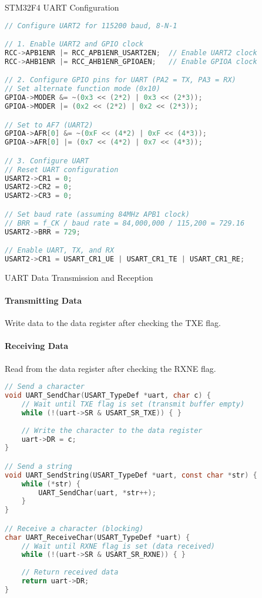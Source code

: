 \begin{code}{STM32F4 UART Configuration}
\begin{lstlisting}[language=C, style=basesmol]
// Configure UART2 for 115200 baud, 8-N-1

// 1. Enable UART2 and GPIO clock
RCC->APB1ENR |= RCC_APB1ENR_USART2EN;  // Enable UART2 clock
RCC->AHB1ENR |= RCC_AHB1ENR_GPIOAEN;   // Enable GPIOA clock

// 2. Configure GPIO pins for UART (PA2 = TX, PA3 = RX)
// Set alternate function mode (0x10)
GPIOA->MODER &= ~(0x3 << (2*2) | 0x3 << (2*3));
GPIOA->MODER |= (0x2 << (2*2) | 0x2 << (2*3));

// Set to AF7 (UART2)
GPIOA->AFR[0] &= ~(0xF << (4*2) | 0xF << (4*3));
GPIOA->AFR[0] |= (0x7 << (4*2) | 0x7 << (4*3));

// 3. Configure UART
// Reset UART configuration
USART2->CR1 = 0;
USART2->CR2 = 0;
USART2->CR3 = 0;

// Set baud rate (assuming 84MHz APB1 clock)
// BRR = f_CK / baud rate = 84,000,000 / 115,200 = 729.16
USART2->BRR = 729;

// Enable UART, TX, and RX
USART2->CR1 = USART_CR1_UE | USART_CR1_TE | USART_CR1_RE;
\end{lstlisting}
\end{code}

\begin{KR}{UART Data Transmission and Reception}
\paragraph{Transmitting Data}
Write data to the data register after checking the TXE flag.
\paragraph{Receiving Data}
Read from the data register after checking the RXNE flag.

\begin{lstlisting}[language=C, style=basesmol]
// Send a character
void UART_SendChar(USART_TypeDef *uart, char c) {
    // Wait until TXE flag is set (transmit buffer empty)
    while (!(uart->SR & USART_SR_TXE)) { }
    
    // Write the character to the data register
    uart->DR = c;
}

// Send a string
void UART_SendString(USART_TypeDef *uart, const char *str) {
    while (*str) {
        UART_SendChar(uart, *str++);
    }
}

// Receive a character (blocking)
char UART_ReceiveChar(USART_TypeDef *uart) {
    // Wait until RXNE flag is set (data received)
    while (!(uart->SR & USART_SR_RXNE)) { }
    
    // Return received data
    return uart->DR;
}
\end{lstlisting}
\end{KR}

